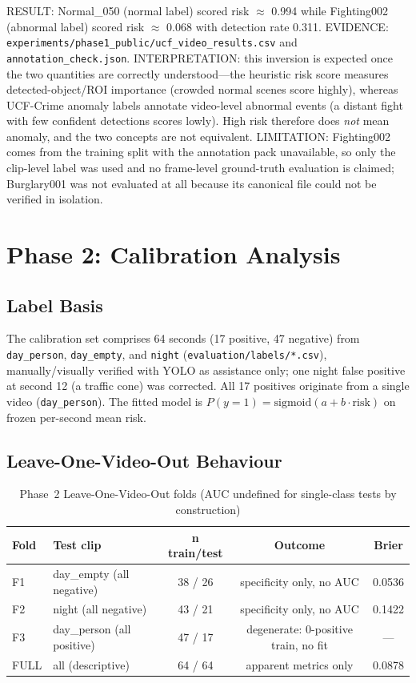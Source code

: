 RESULT: Normal\_050 (normal label) scored risk $\approx$ 0.994 while Fighting002 (abnormal label) scored risk $\approx$ 0.068 with detection rate 0.311. EVIDENCE: \texttt{experiments/phase1\_public/ucf\_video\_results.csv} and \texttt{annotation\_check.json}. INTERPRETATION: this inversion is expected once the two quantities are correctly understood---the heuristic risk score measures detected-object/ROI importance (crowded normal scenes score highly), whereas UCF-Crime anomaly labels annotate video-level abnormal events (a distant fight with few confident detections scores lowly). High risk therefore does \textit{not} mean anomaly, and the two concepts are not equivalent. LIMITATION: Fighting002 comes from the training split with the annotation pack unavailable, so only the clip-level label was used and no frame-level ground-truth evaluation is claimed; Burglary001 was not evaluated at all because its canonical file could not be verified in isolation.

\section{Phase 2: Calibration Analysis}

\subsection{Label Basis}

The calibration set comprises 64 seconds (17 positive, 47 negative) from \texttt{day\_person}, \texttt{day\_empty}, and \texttt{night} (\texttt{evaluation/labels/*.csv}), manually/visually verified with YOLO as assistance only; one night false positive at second 12 (a traffic cone) was corrected. All 17 positives originate from a single video (\texttt{day\_person}). The fitted model is $P(y{=}1)=\mathrm{sigmoid}(a+b\cdot\mathrm{risk})$ on frozen per-second mean risk.

\subsection{Leave-One-Video-Out Behaviour}

\begin{table}[H]
\centering
\caption{Phase~2 Leave-One-Video-Out folds (AUC undefined for single-class tests by construction)}
\label{tab:phase2-lovo}
\begin{tabular}{|l|l|c|c|c|}
\hline
\textbf{Fold} & \textbf{Test clip} & \textbf{n train/test} & \textbf{Outcome} & \textbf{Brier} \\
\hline
F1 & day\_empty (all negative) & 38 / 26 & specificity only, no AUC & 0.0536 \\
F2 & night (all negative) & 43 / 21 & specificity only, no AUC & 0.1422 \\
F3 & day\_person (all positive) & 47 / 17 & degenerate: 0-positive train, no fit & --- \\
FULL & all (descriptive) & 64 / 64 & apparent metrics only & 0.0878 \\
\hline
\end{tabular}
\end{table}

